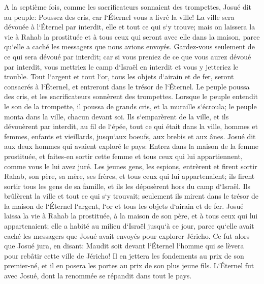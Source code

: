 \verse A la septième fois, comme les sacrificateurs sonnaient des trompettes, Josué dit au peuple: Poussez des cris, car l`Éternel vous a livré la ville! 
\verse La ville sera dévouée à l`Éternel par interdit, elle et tout ce qui s`y trouve; mais on laissera la vie à Rahab la prostituée et à tous ceux qui seront avec elle dans la maison, parce qu`elle a caché les messagers que nous avions envoyés. 
\verse Gardez-vous seulement de ce qui sera dévoué par interdit; car si vous preniez de ce que vous aurez dévoué par interdit, vous mettriez le camp d`Israël en interdit et vous y jetteriez le trouble. 
\verse Tout l`argent et tout l`or, tous les objets d`airain et de fer, seront consacrés à l`Éternel, et entreront dans le trésor de l`Éternel. 
\verse Le peuple poussa des cris, et les sacrificateurs sonnèrent des trompettes. Lorsque le peuple entendit le son de la trompette, il poussa de grands cris, et la muraille s`écroula; le peuple monta dans la ville, chacun devant soi. Ils s`emparèrent de la ville, 
\verse et ils dévouèrent par interdit, au fil de l`épée, tout ce qui était dans la ville, hommes et femmes, enfants et vieillards, jusqu`aux boeufs, aux brebis et aux ânes. 
\verse Josué dit aux deux hommes qui avaient exploré le pays: Entrez dans la maison de la femme prostituée, et faites-en sortir cette femme et tous ceux qui lui appartiennent, comme vous le lui avez juré. 
\verse Les jeunes gens, les espions, entrèrent et firent sortir Rahab, son père, sa mère, ses frères, et tous ceux qui lui appartenaient; ils firent sortir tous les gens de sa famille, et ils les déposèrent hors du camp d`Israël. 
\verse Ils brûlèrent la ville et tout ce qui s`y trouvait; seulement ils mirent dans le trésor de la maison de l`Éternel l`argent, l`or et tous les objets d`airain et de fer. 
\verse Josué laissa la vie à Rahab la prostituée, à la maison de son père, et à tous ceux qui lui appartenaient; elle a habité au milieu d`Israël jusqu`à ce jour, parce qu`elle avait caché les messagers que Josué avait envoyés pour explorer Jéricho. 
\verse Ce fut alors que Josué jura, en disant: Maudit soit devant l`Éternel l`homme qui se lèvera pour rebâtir cette ville de Jéricho! Il en jettera les fondements au prix de son premier-né, et il en posera les portes au prix de son plus jeune fils. 
\verse L`Éternel fut avec Josué, dont la renommée se répandit dans tout le pays. 

